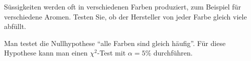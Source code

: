 Süssigkeiten werden oft in verschiedenen Farben produziert, zum Beispiel
für verschiedene Aromen. Testen Sie, ob der Hersteller von jeder Farbe
gleich viele abfüllt.

\begin{loesung}
Man testet die Nullhypothese ``alle Farben sind gleich häufig''. Für
diese Hypothese kann man einen $\chi^2$-Test mit $\alpha=5\%$ durchführen.
\end{loesung}


